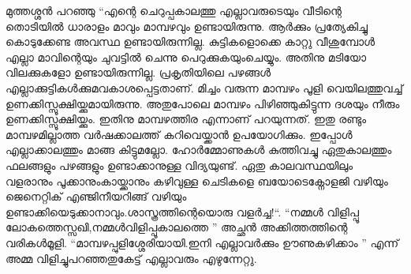 മുത്തശ്ശൻ പറഞ്ഞു ``എന്റെ ചെറുപ്പകാലത്തു എല്ലാവരുടെയും വീടിന്റെ തൊടിയിൽ ധാരാളം മാവും മാമ്പഴവും ഉണ്ടായിരുന്നു. ആർക്കും പ്രത്യേകിച്ചു കൊടുക്കേണ്ട അവസ്ഥ ഉണ്ടായിരുന്നില്ല. കുട്ടികളൊക്കെ കാറ്റു വീശുമ്പോൾ എല്ലാ മാവിന്റെയും ചുവട്ടിൽ ചെന്നു പെറുക്കുകയുംചെയ്യും. അതിനു മടിയോ വിലക്കുകളോ ഉണ്ടായിരുന്നില്ല. പ്രകൃതിയിലെ പഴങ്ങൾ എല്ലാക്കുട്ടികൾക്കുമവകാശപ്പെട്ടതാണ്‌. മിച്ചം വരുന്ന മാമ്പഴം പൂളി വെയിലത്തുവച്ച് ഉണക്കിസ്സൂക്ഷിയ്ക്കുമായിരുന്നു. അതുപോലെ മാമ്പഴം പിഴിഞ്ഞുകിട്ടുന്ന ദശയും നീരും ഉണക്കിസ്സൂക്ഷിയ്ക്കും. ഇതിനു മാമ്പഴത്തിര എന്നാണ്‌ പറയുന്നത്. ഇതു രണ്ടും മാമ്പഴമില്ലാത്ത വർഷക്കാലത്ത് കറിവെയ്ക്കാൻ ഉപയോഗിക്കും. ഇപ്പോൾ എല്ലാക്കാലത്തും മാങ്ങ കിട്ടുമല്ലോ. ഹോർമ്മോണുകൾ കുത്തിവച്ചു ഏതുകാലത്തും ഫലങ്ങളും പഴങ്ങളും ഉണ്ടാക്കാനുള്ള വിദ്യയുണ്ട്. ഏതു കാലവസ്ഥയിലും വളരാനും പൂക്കാനുംകായ്ക്കാനും കഴിവുള്ള ചെടികളെ ബയോടെക്നോളജി വഴിയും ജെനെറ്റിക് എഞ്ജിനീയറിങ്ങ് വഴിയും ഉണ്ടാക്കിയെടുക്കാനാവും.ശാസ്ത്രത്തിന്റെയൊരു വളർച്ച!``.
\hspace{2em}``നമ്മൾ വിളിപ്പൂ ലോകത്തെസ്സഖി,നമ്മൾവിളിപ്പൂകാലത്തെ ''
അച്ഛൻ അക്കിത്തത്തിന്റെ വരികൾമൂളി. ``മാമ്പഴപ്പുളിശ്ശേരിയായി.ഇനി എല്ലാവർക്കും ഊണുകഴിക്കാം '' എന്ന് അമ്മ വിളിച്ചുപറഞ്ഞതുകേട്ട് എല്ലാവരും എഴുന്നേറ്റു. 
